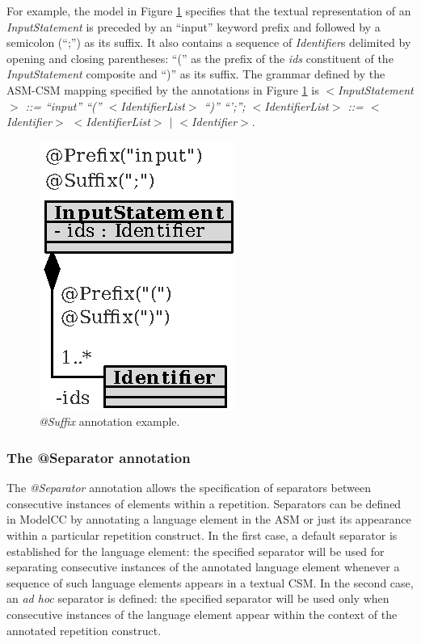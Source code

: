 \documentclass[a4paper,twoside,onecolumn]{article}
\newcommand{\etexttt}[1]{\textit{#1}}
\newcommand{\an}[1]{\emph{#1}} %
\begin{document}
For example, the model in Figure \ref{fig:inputstatement} specifies that the textual representation of an \emph{InputStatement} is preceded by an ``input'' keyword prefix and followed by a semicolon (``;'') as its suffix.
It also contains a sequence of \emph{Identifier}s delimited by opening and closing parentheses: ``('' as the prefix of the \emph{ids} constituent of the \emph{InputStatement} composite and ``)'' as its suffix.
The grammar defined by the ASM-CSM mapping specified by the annotations in Figure \ref{fig:inputstatement} is \etexttt{$<$InputStatement$>$ ::= ``input'' ``('' $<$IdentifierList$>$ ``)'' ``';''; $<$IdentifierList$>$ ::= $<$Identifier$>$ $<$IdentifierList$>$ $|$ $<$Identifier$>$}.

\begin{figure}[tb!]
\centering
\includegraphics[scale=1]{inputstatement.eps}
\caption{\an{@Suffix} annotation example.} \label{fig:inputstatement}
\end{figure}

\subsubsection{The @Separator annotation}

The \an{@Separator} annotation allows the specification of separators between consecutive instances of elements within a repetition.
Separators can be defined in ModelCC by annotating a language element in the ASM or just its appearance within a particular repetition construct.
In the first case, a default separator is established for the language element: the specified separator will be used for separating consecutive instances of the annotated language element whenever a sequence of such language elements appears in a textual CSM.
In the second case, an \emph{ad hoc} separator is defined: the specified separator will be used only when consecutive instances of the language element appear within the context of the annotated repetition construct.
\end{document}
